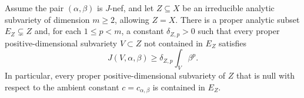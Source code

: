 \documentclass[10pt,a4paper]{amsart}
\newcommand{\cab}{c_{\alpha,\beta}}
\begin{document}
\begin{lemma}\label{lem:local-gap}
Assume the pair $(\alpha,\beta)$ is $J$-nef, and let \(Z\subseteq X\) be an irreducible analytic subvariety of dimension \(m\ge2\), allowing \(Z=X\). There is a proper analytic subset \(E_Z\subsetneq Z\) and, for each \(1\le p<m\), a constant \(\delta_{Z,p}>0\) such that every proper positive-dimensional subvariety \(V\subset Z\) not contained in \(E_Z\) satisfies
\begin{equation}\label{eq:local-gap}
J(V,\alpha,\beta)\ge\delta_{Z,p}\int_V\beta^p.
\end{equation}
In particular, every proper positive-dimensional subvariety of $Z$ that is null with respect to the ambient constant $c=\cab$ is contained in \(E_Z\).
\end{lemma}
\end{document}
